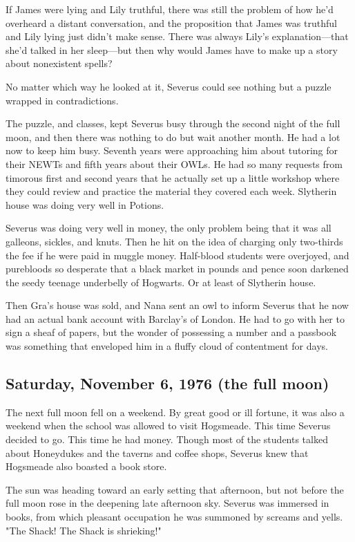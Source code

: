 If James were lying and Lily truthful, there was still the problem of how he'd overheard a distant conversation, and the proposition that James was truthful and Lily lying just didn't make sense. There was always Lily's explanation—that she'd talked in her sleep—but then why would James have to make up a story about nonexistent spells?

No matter which way he looked at it, Severus could see nothing but a puzzle wrapped in contradictions.

The puzzle, and classes, kept Severus busy through the second night of the full moon, and then there was nothing to do but wait another month. He had a lot now to keep him busy. Seventh years were approaching him about tutoring for their NEWTs and fifth years about their OWLs. He had so many requests from timorous first and second years that he actually set up a little workshop where they could review and practice the material they covered each week. Slytherin house was doing very well in Potions.

Severus was doing very well in money, the only problem being that it was all galleons, sickles, and knuts. Then he hit on the idea of charging only two-thirds the fee if he were paid in muggle money. Half-blood students were overjoyed, and purebloods so desperate that a black market in pounds and pence soon darkened the seedy teenage underbelly of Hogwarts. Or at least of Slytherin house.

Then Gra's house was sold, and Nana sent an owl to inform Severus that he now had an actual bank account with Barclay's of London. He had to go with her to sign a sheaf of papers, but the wonder of possessing a number and a passbook was something that enveloped him in a fluffy cloud of contentment for days.

\subsection{Saturday, November 6, 1976 (the full moon)}

The next full moon fell on a weekend. By great good or ill fortune, it was also a weekend when the school was allowed to visit Hogsmeade. This time Severus decided to go. This time he had money. Though most of the students talked about Honeydukes and the taverns and coffee shops, Severus knew that Hogsmeade also boasted a book store.

The sun was heading toward an early setting that afternoon, but not before the full moon rose in the deepening late afternoon sky. Severus was immersed in books, from which pleasant occupation he was summoned by screams and yells. "The Shack! The Shack is shrieking!"

